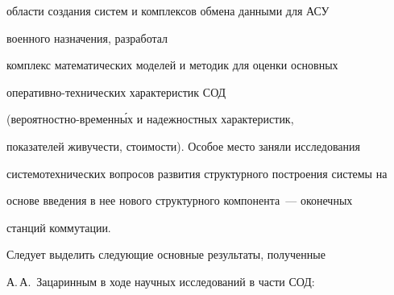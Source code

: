 об\-ласти создания сис\-тем и комплексов обмена данными для АСУ 


военного назначения, разработал 


комплекс математических моделей и методик для оценки основных 


опе\-ра\-тив\-но-тех\-ни\-че\-ских характеристик СОД 


(ве\-ро\-ят\-но\-ст\-но-вре\-мен\-н\'{ы}х и надежностных характеристик, 


показателей живучести, стоимости). Особое место заняли исследования 


сис\-те\-мо\-тех\-ни\-че\-ских вопросов развития структурного построения сис\-те\-мы на 


основе введения в нее нового структурного компонента~--- оконечных 


станций коммутации.





Следует выделить следующие основные результаты, полученные 


А.\,А.~Зацаринным в ходе научных исследований в части СОД:


